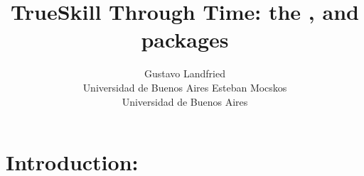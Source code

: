 \documentclass[article]{jss}
\author{Gustavo Landfried \\Universidad de Buenos Aires
   \And Esteban Mocskos \\Universidad de Buenos Aires}
\title{TrueSkill Through Time: the \proglang{Julia}, \proglang{Python} and \proglang{R} packages}
\newif\ifen
\newif\ifes
\newcommand{\en}[1]{\ifen#1\fi}
\newcommand{\es}[1]{\ifes#1\fi}
\begin{document}

\section[Introduction]{Introduction: } \label{sec:intro}

\en{Humans develop complex skills because of an special integration of biological, cognitive and social processes~\citep{Koster2020}.}
\es{Los humanos desarrollan habilidades complejas gracias a una integraci\'on especial de los procesos biol\'ogicos, cognitivos y sociales~\citep{Koster2020}.}
%
\en{An exceptional cognitive ability to imitate, combined with long periods of juvenile dependency and postreproductive life span, allows humans to learn things from others and transmit innovations through generations~\citep{Richerson2020}.}
\es{Una extraordinaria capacidad para imitar, combinada con los largos per\'iodos de aprendizaje juvenil y vida posreproductiva, permite a los humanos aprender de los dem\'as y transmitir las innovaci\'on a trav\'es de la generaciones~\citep{Richerson2020}.}
%
\en{As a population-based process, human adaptation is also affected by demographic characteristics, such as the size and structure of populations~\citep{Derex2020}.}
\es{Al ser un proceso poblacional, la adaptaci\'on humana tambi\'en se ve afectada por caracter\'isticas demogr\'aficas, como el tama\~no y estructura de las poblaciones~\citep{Derex2020}.} 

%
\end{document}
